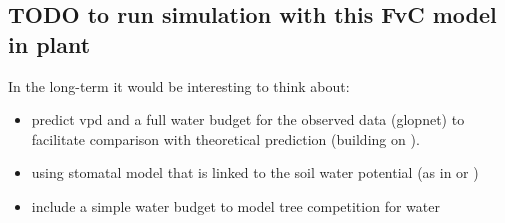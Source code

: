 \documentclass[a4paper,11pt]{article}
\begin{document}
\subsection{TODO to run simulation with this FvC model in plant}


In the long-term it would be interesting to think about:

\begin{itemize}

\item predict vpd and a full water budget for the observed data (glopnet) to facilitate comparison with theoretical prediction (building on \citet{Prentice-2014}).

\item using stomatal model that is linked to the soil water potential (as in \citet{Sperry-2016} or 
\citet{Sterck-2011})

\item include a simple water budget to model tree competition for water

\end{itemize}













\end{document}
